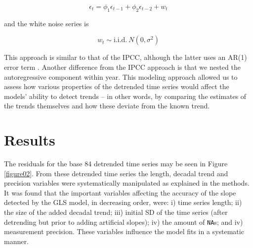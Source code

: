 \documentclass[]{ametsoc}
\begin{document}
$$\epsilon_{t} = \phi_{1}\epsilon_{t-1} + \phi_{2}\epsilon_{t-2} + w_{t}$$

and the white noise series is

$$w_{t} \sim \mathrm{i.i.d.}~N(0,\sigma^{2})$$

This approach is similar to that of the IPCC, although the latter uses an AR(1) error term \citep{IPCC2013supp}. Another difference from the IPCC approach is that we nested the autoregressive component within year. This modeling approach allowed us to assess how various properties of the detrended time series would affect the models' ability to detect trends -- in other words, by comparing the estimates of the trends themselves and how these deviate from the known trend.

\section{Results}
The residuals for the base 84 detrended time series may be seen in Figure \ref{figure02}. From these detrended time series the length, decadal trend and precision variables were systematically manipulated as explained in the methods. It was found that the important variables affecting the accuracy of the slope detected by the GLS model, in decreasing order, were: i) time series length; ii) the size of the added decadal trend; iii) initial SD of the time series (after detrending but prior to adding artificial slopes); iv) the amount of \texttt{NA}s; and iv) measurement precision. These variables influence the model fits in a systematic manner.
\end{document}

